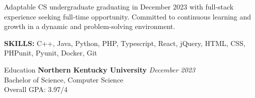 \documentclass[11pt]{resume}
\begin{document}
{\centering 
Adaptable CS undergraduate graduating in December 2023 with full-stack experience seeking full-time opportunity. Committed to continuous learning and growth in a dynamic and problem-solving environment.
\par
}
\vspace{10pt}

{\textbf{SKILLS:}} C++, Java, Python, PHP, Typescript, React, jQuery, HTML, CSS, PHPunit, Pyunit, Docker, Git \\
\vspace*{-10pt}

\begin{rSection}{Education}
    \textbf{Northern Kentucky University} \hfill \textit{December 2023} \\ 
    Bachelor of Science, Computer Science \\
    Overall GPA: 3.97/4

\end{rSection}
\end{document}
